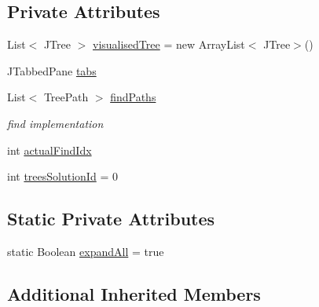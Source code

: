 \subsection*{Private Attributes}
\begin{DoxyCompactItemize}
\item 
List$<$ J\-Tree $>$ \hyperlink{classit_1_1emarolab_1_1cagg_1_1debugging_1_1baseComponents_1_1customPanel_1_1SemanticTreeGuiPanel_ae867ddf7fcdc92008227b18b8b208719}{visualised\-Tree} = new Array\-List$<$ J\-Tree$>$()
\item 
J\-Tabbed\-Pane \hyperlink{classit_1_1emarolab_1_1cagg_1_1debugging_1_1baseComponents_1_1customPanel_1_1SemanticTreeGuiPanel_a81b9fc328c5b937f5b3bf346d82f4ef2}{tabs}
\item 
List$<$ Tree\-Path $>$ \hyperlink{classit_1_1emarolab_1_1cagg_1_1debugging_1_1baseComponents_1_1customPanel_1_1SemanticTreeGuiPanel_afdee6615327380b676cb15e5bd380dbe}{find\-Paths}
\begin{DoxyCompactList}\small\item\em find implementation \end{DoxyCompactList}\item 
int \hyperlink{classit_1_1emarolab_1_1cagg_1_1debugging_1_1baseComponents_1_1customPanel_1_1SemanticTreeGuiPanel_a5b587a707822c9844abd914179ccd3a1}{actual\-Find\-Idx}
\item 
int \hyperlink{classit_1_1emarolab_1_1cagg_1_1debugging_1_1baseComponents_1_1customPanel_1_1SemanticTreeGuiPanel_a13c41d931a65b9c8b5d7d6a455e23472}{trees\-Solution\-Id} = 0
\end{DoxyCompactItemize}
\subsection*{Static Private Attributes}
\begin{DoxyCompactItemize}
\item 
static Boolean \hyperlink{classit_1_1emarolab_1_1cagg_1_1debugging_1_1baseComponents_1_1customPanel_1_1SemanticTreeGuiPanel_a7e270d24065cc124933629b3e155d57b}{expand\-All} = true
\end{DoxyCompactItemize}
\subsection*{Additional Inherited Members}


